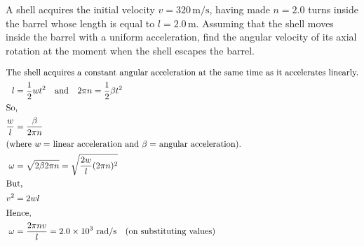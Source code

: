 
\item A shell acquires the initial velocity \(v = 320 \, \text{m/s}\), having made \(n = 2.0\) turns inside the barrel whose length is equal to \(l = 2.0 \, \text{m}\). Assuming that the shell moves inside the barrel with a uniform acceleration, find the angular velocity of its axial rotation at the moment when the shell escapes the barrel.
    \begin{center}
    \end{center}

\begin{solution}
    \begin{center}
    \end{center}
    
    \begin{align*}
        \intertext{The shell acquires a constant angular acceleration at the same time as it accelerates linearly.}
        l &= \dfrac{1}{2}wt^2 \quad \text{and} \quad 2\pi n = \dfrac{1}{2}\beta t^2\\
        \intertext{So,}
        \dfrac{w}{l} &= \dfrac{\beta}{2\pi n}\\
        \intertext{(where \( w = \) linear acceleration and \( \beta = \) angular acceleration).}
        \omega &= \sqrt{2\beta 2\pi n} = \sqrt{\dfrac{2w}{l}(2\pi n)^2}\\
        \intertext{But,}
        v^2 &= 2wl\\
        \intertext{Hence,}
        \omega &= \dfrac{2\pi nv}{l} = 2.0 \times 10^3 \text{ rad/s} \quad \text{(on substituting values)}
    \end{align*}
\end{solution}
